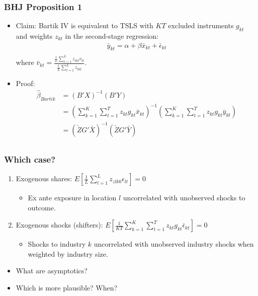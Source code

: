 \documentclass[english,xcolor=svgnames]{beamer}
\begin{document}
\begin{frame}
\frametitle[alignment=center]{BHJ Proposition 1}
\begin{itemize}
	\item Claim: Bartik IV is equivalent to TSLS with $KT$ excluded instruments $g_{kt}$ and weights $z_{kt}$ in the second-stage regression:
	\begin{align*}
		\bar{y}_{kt} = \alpha + \beta \bar{x}_{kt} + \bar{\epsilon}_{kt}\\
	\end{align*}
	where $\bar{v}_{kt} = \frac{\frac{1}{L}\sum_{l=1}^{L}z_{lkt}v_{lt}}{\frac{1}{L}\sum_{l=1}^{L}z_{lkt}}$.
	\item Proof:
	\begin{align*}
		\hat{\beta}_{Bartik} &= (B'X)^{-1}(B'Y) \\
		&=\left(\sum_{k=1}^K \sum_{t=1}^{T} z_{kt}    g_{kt} \bar{x}_{kt}\right)^{-1}\left(\sum_{k=1}^K \sum_{t=1}^{T} z_{kt}    g_{kt} \bar{y}_{kt}\right) \\
		&= (\check{Z}G'\bar{X})^{-1}(\check{Z}G'\bar{Y}) \\
	\end{align*}
\end{itemize}
\end{frame}




\begin{frame}
\frametitle[alignment=center]{Which case?}
\begin{enumerate}
	\item Exogenous shares: $E\left[\frac{1}{L}\sum_{l=1}^{L}z_{zlk0}\epsilon_{lt}\right] =0$
	\begin{itemize}
		\item Ex ante exposure in location $l$ uncorrelated with unobserved shocks to outcome.
	\end{itemize}
	\item Exogenous shocks (shifters): $E\left[\frac{1}{KT}\sum_{k=1}^K \sum_{t=1}^{T} z_{kt}    g_{kt} \bar{\epsilon}_{kt}\right] =0$
	\begin{itemize}
		\item Shocks to industry $k$ uncorrelated with unobserved industry shocks when weighted by industry size.
	\end{itemize}
\end{enumerate}
\begin{itemize}
	\item What are asymptotics?
	\item Which is more plausible? When?
\end{itemize}
\end{frame}
\end{document}
